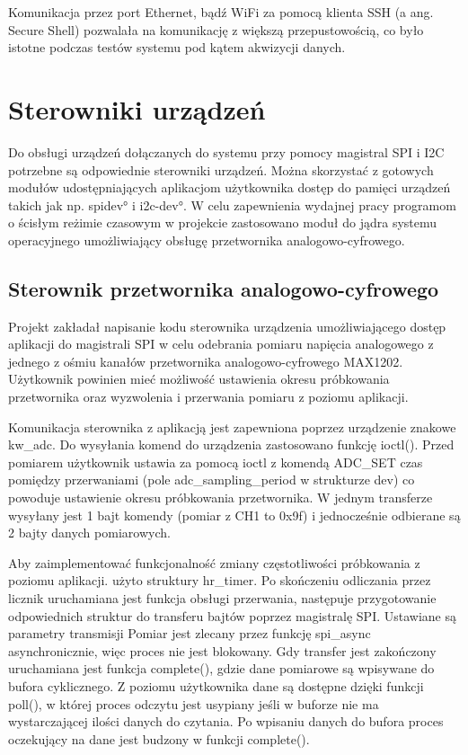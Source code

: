 Komunikacja przez port Ethernet, bądź WiFi za pomocą klienta SSH (a ang. Secure Shell) pozwalała na komunikację z większą przepustowością, co było istotne podczas testów systemu pod kątem akwizycji danych. 

\section{Sterowniki urządzeń}
Do obsługi urządzeń dołączanych do systemu przy pomocy magistral SPI i I2C potrzebne są odpowiednie sterowniki urządzeń. Można skorzystać z gotowych modułów udostępniających aplikacjom użytkownika dostęp do pamięci urządzeń takich jak np. \ang{spidev}\cite{spidev} i \ang{i2c-dev}\cite{i2cdev}. W celu zapewnienia wydajnej pracy programom o ścisłym reżimie czasowym w projekcie zastosowano moduł do jądra systemu operacyjnego umożliwiający obsługę przetwornika analogowo-cyfrowego.

\subsection{Sterownik przetwornika analogowo-cyfrowego}

Projekt zakładał napisanie kodu sterownika urządzenia umożliwiającego dostęp aplikacji do magistrali SPI w celu odebrania pomiaru napięcia analogowego z jednego z ośmiu kanałów przetwornika analogowo-cyfrowego MAX1202. Użytkownik powinien mieć możliwość ustawienia okresu próbkowania przetwornika
oraz wyzwolenia i przerwania pomiaru z poziomu aplikacji. 

Komunikacja sterownika z aplikacją jest zapewniona poprzez urządzenie znakowe kw\_adc.
Do wysyłania komend do urządzenia zastosowano funkcję ioctl(). Przed pomiarem użytkownik ustawia za pomocą ioctl z komendą ADC\_SET czas pomiędzy przerwaniami (pole adc\_sampling\_period w strukturze dev) co powoduje ustawienie okresu próbkowania przetwornika. 
W jednym transferze wysyłany jest 1 bajt komendy (pomiar z CH1 to 0x9f) i jednocześnie odbierane są 2 bajty danych pomiarowych. 

Aby zaimplementować funkcjonalność zmiany częstotliwości próbkowania z poziomu aplikacji. 
użyto struktury hr\_timer. Po skończeniu odliczania przez licznik uruchamiana jest funkcja obsługi przerwania, następuje przygotowanie odpowiednich struktur do transferu bajtów poprzez magistralę SPI. Ustawiane są parametry transmisji Pomiar jest zlecany przez funkcję spi\_async asynchronicznie, więc proces nie jest blokowany. Gdy transfer jest zakończony uruchamiana jest funkcja complete(), gdzie dane pomiarowe są wpisywane do bufora cyklicznego. Z poziomu użytkownika dane są dostępne dzięki funkcji poll(), w której proces odczytu jest usypiany jeśli w buforze nie ma wystarczającej ilości danych do czytania. Po wpisaniu danych do bufora proces oczekujący na dane jest budzony w funkcji complete().


